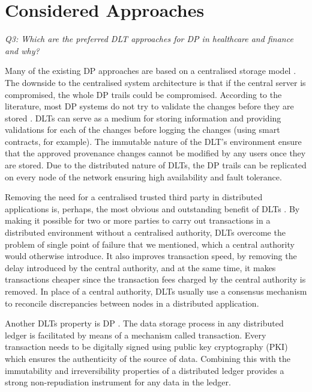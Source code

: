 
\section{Considered Approaches}
\label{sec:consideredapproaches}

\textit{Q3: Which are the preferred DLT approaches for DP in healthcare and finance and why?}\newline

Many of the existing DP approaches are based on a centralised storage model \cite{req_security}. The downside to the centralised system architecture is that if the central server is compromised, the whole DP trails could be compromised. According to the literature, most DP systems do not try to validate the changes before they are stored \cite{req_security}. DLTs can serve as a medium for storing information and providing validations for each of the changes before logging the changes (using smart contracts, for example). The immutable nature of the DLT's environment ensure that the approved provenance changes cannot be modified by any users once they are stored. Due to the distributed nature of DLTs, the DP trails can be replicated on every node of the network ensuring high availability and fault tolerance.

Removing the need for a centralised trusted third party in distributed applications is, perhaps, the most obvious and outstanding benefit of DLTs \cite{agbo2019blockchain}. By making it possible for two or more parties to carry out transactions in a distributed environment without a centralised authority, DLTs overcome the problem of single point of failure that we mentioned, which a central authority would otherwise introduce. It also improves transaction speed, by removing the delay introduced by the central authority, and at the same time, it makes transactions cheaper since the transaction fees charged by the central authority is removed. In place of a central authority, DLTs usually use a consensus mechanism to reconcile discrepancies between nodes in a distributed application.

Another DLTs property is DP \cite{dlt_3}. The data storage process in any distributed ledger is facilitated by means of a mechanism called transaction. Every transaction needs to be digitally signed using public key cryptography (PKI) which ensures the authenticity of the source of data. Combining this with the immutability and irreversibility properties of a distributed ledger provides a strong non-repudiation instrument for any data in the ledger.

